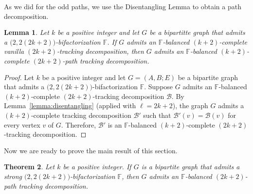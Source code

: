 \documentclass[12pt,reqno,a4paper]{amsart}
\newtheorem{theorem}{Theorem}[section]
\newtheorem{lemma}[theorem]{Lemma}
\newcommand{\B}{\mathcal{B}}
\begin{document}

As we did for the odd paths, we use the Disentangling Lemma to obtain a path decomposition.


\begin{lemma}\label{lemma:even-path-dec}
	Let \(k\) be a positive integer and let \(G\) be a bipartitte graph that admits a 
	\(\big(2,2(2k+2)\big)\)-bifactorization \(\mathbb{F}\).
	If \(G\) admits an \(\mathbb{F}\)-balanced \((k+2)\)-complete 
	vanilla $(2k+2)$-tracking decomposition, 
	then \(G\) admits an \(\mathbb{F}\)-balanced \((k+2)\)-complete 
	$(2k+2)$-path tracking decomposition.
\end{lemma}

\begin{proof}
	Let \(k\) be a positive integer and let \(G = (A,B;E)\) be a 
	bipartite graph that admits a 
	\(\big(2,2(2k+2)\big)\)-bifactorization \(\mathbb{F}\).
	Suppose $G$ admits an \(\mathbb{F}\)-balanced 
	\((k+2)\)-complete
	$(2k+2)$-tracking decomposition $\B$.
	By Lemma~\ref{lemma:disentangling} (applied with \(\ell = 2k+2\)),
	the graph \(G\) admits a \((k+2)\)-complete tracking decomposition \(\B'\)
	such that \(\B'(v) = \B(v)\)
	for every vertex \(v\) of \(G\).
	Therefore, \(\B'\) is an \(\mathbb{F}\)-balanced 
	$(k+2)$-complete $(2k+2)$-tracking decomposition.
\end{proof}


Now we are ready to prove the main result of this section.


\begin{theorem}\label{thm:even-path-decomposition}
	Let \(k\) be a positive integer. 
	If \(G\) is a bipartite graph that 
admits a strong 
	\(\big(2,2(2k+2)\big)\)-bifactorization \(\mathbb{F}\),
	then \(G\) admits an \(\mathbb{F}\)-balanced $(2k+2)$-path 
tracking decomposition.
\end{theorem}
\end{document}

